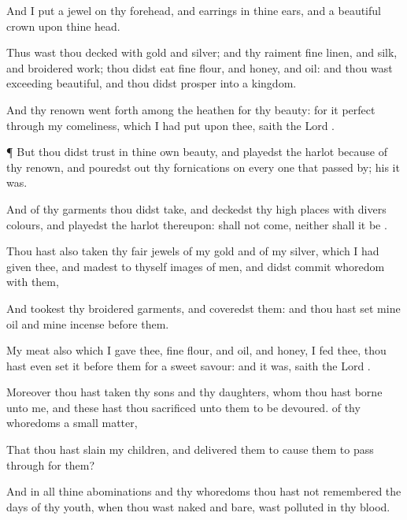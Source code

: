 {And I
put a
jewel on thy
forehead, and
earrings in thine
ears, and a
beautiful
crown upon thine
head.

Thus wast thou
decked with
gold and
silver; and thy
raiment
{} fine
linen, and
silk, and broidered
work; thou didst
eat fine
flour, and
honey, and
oil: and thou wast
exceeding
beautiful, and thou didst
prosper into a
kingdom.

And thy
renown went
forth among the
heathen for thy
beauty: for it
{}
perfect through my
comeliness, which I had
put upon thee,
saith the
Lord
{}.


\par }{\PP {}¶ But thou didst
trust in thine own
beauty, and playedst the
harlot because of thy
renown, and pouredst
out thy
fornications on every one that passed
by; his it was.

And of thy
garments thou didst
take, and
deckedst thy high
places with divers
colours, and playedst the
harlot thereupon:
{} shall not
come, neither shall it be
{}.

Thou hast also
taken thy
fair
jewels of my
gold and of my
silver, which I had
given thee, and
madest to thyself
images of
men, and didst commit
whoredom with them,

And
tookest thy
broidered
garments, and
coveredst them: and thou hast
set mine
oil and mine
incense
before them.

My
meat also which I
gave thee, fine
flour, and
oil, and
honey,
{} I
fed thee, thou hast even
set it
before them for a
sweet
savour: and
{} it was,
saith the
Lord
{}.

Moreover thou hast
taken thy
sons and thy
daughters, whom thou hast
borne unto me, and these hast thou
sacrificed unto them to be
devoured.
{} of thy
whoredoms a small
matter,

That thou hast
slain my
children, and
delivered them to cause them to pass
through
{} for them?

And in all thine
abominations and thy
whoredoms thou hast not
remembered the
days of thy
youth, when thou wast
naked and
bare,
{} wast
polluted in thy
blood.

}
